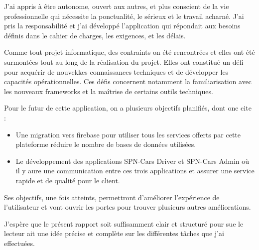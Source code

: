 J'ai appris à être autonome, ouvert aux autres, et plus conscient de la vie professionnelle qui nécessite la ponctualité, le sérieux et le travail acharné. J'ai pris la responsabilité et j'ai développé l'application qui répondait aux besoins définis dans le cahier de charges, les exigences, et les délais.

Comme tout projet informatique, des contraints on été rencontrées et elles ont été surmontées tout au long de la réalisation du projet. Elles ont constitué un défi pour acquérir de nouvekkes connaissances techniques et de développer les capacités opérationnelles. Ces défis concernent notamment la familiarisation avec les nouveaux frameworks et la maîtrise de certains outils techniques.

Pour le futur de cette application, on a plusieurs objectifs planifiés, dont one cite :
\begin{itemize}
    \item Une migration vers firebase pour utiliser tous les services offerts par cette plateforme réduire le nombre de bases de données utilisées.
    \item Le développement des applications SPN-Cars Driver et SPN-Cars Admin où il y aure une communication entre ces trois applications et assurer une service rapide et de qualité pour le client.
\end{itemize}
Ses objectifs, une fois atteints, permettront d'améliorer l'expérience de l'utilisateur et vont ouvrir les portes pour trouver plusieurs autres améliorations.

J'espère que le présent rapport soit suffisamment clair et structuré pour sue le lecteur ait une idée précise et complète sur les différentes tâches que j'ai effectuées.